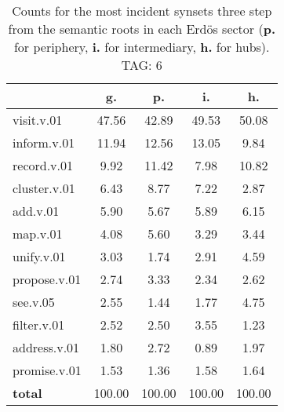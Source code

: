 \begin{table}[h!]
\begin{center}
\begin{tabular}{| l || c | c | c | c |}\hline
 & {\bf g.} & {\bf p.} & {\bf i.} & {\bf h.} \\\hline\hline
visit.v.01 & 47.56  & 42.89  & 49.53  & 50.08 \\\hline
inform.v.01 & 11.94  & 12.56  & 13.05  & 9.84 \\\hline
record.v.01 & 9.92  & 11.42  & 7.98  & 10.82 \\\hline
cluster.v.01 & 6.43  & 8.77  & 7.22  & 2.87 \\\hline
add.v.01 & 5.90  & 5.67  & 5.89  & 6.15 \\\hline
map.v.01 & 4.08  & 5.60  & 3.29  & 3.44 \\\hline
unify.v.01 & 3.03  & 1.74  & 2.91  & 4.59 \\\hline
propose.v.01 & 2.74  & 3.33  & 2.34  & 2.62 \\\hline
see.v.05 & 2.55  & 1.44  & 1.77  & 4.75 \\\hline
filter.v.01 & 2.52  & 2.50  & 3.55  & 1.23 \\\hline
address.v.01 & 1.80  & 2.72  & 0.89  & 1.97 \\\hline
promise.v.01 & 1.53  & 1.36  & 1.58  & 1.64 \\\hline\hline
{{\bf total}} & 100.00  & 100.00  & 100.00  & 100.00 \\\hline
\end{tabular}
\caption{Counts for the most incident synsets three step from the semantic roots in each Erd\"os sector ({\bf p.} for periphery, {\bf i.} for intermediary, {\bf h.} for hubs). TAG: 6}
\end{center}
\end{table}